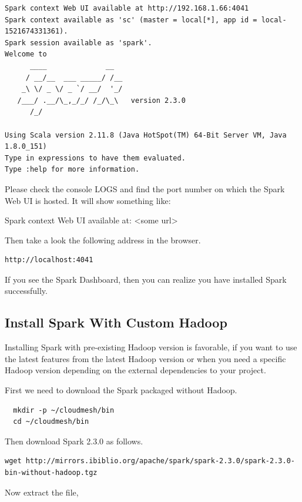 \begin{lstlisting}
Spark context Web UI available at http://192.168.1.66:4041
Spark context available as 'sc' (master = local[*], app id = local-1521674331361).
Spark session available as 'spark'.
Welcome to
      ____              __
     / __/__  ___ _____/ /__
    _\ \/ _ \/ _ `/ __/  '_/
   /___/ .__/\_,_/_/ /_/\_\   version 2.3.0
      /_/
         
Using Scala version 2.11.8 (Java HotSpot(TM) 64-Bit Server VM, Java 1.8.0_151)
Type in expressions to have them evaluated.
Type :help for more information.
\end{lstlisting}

\begin{NOTE}
  Please check the console LOGS and find the port number on which the
  Spark Web UI is hosted. It will show something like:

  Spark context Web UI available at: <some url>
\end{NOTE}

Then take a look the following address in the browser.
\begin{lstlisting}
http://localhost:4041
\end{lstlisting}

If you see the Spark Dashboard, then you can realize you have installed Spark
successfully.

\subsection{Install Spark With Custom Hadoop}

Installing Spark with pre-existing Hadoop version is favorable, if you
want to use the latest features from the latest Hadoop version or when
you need a specific Hadoop version depending on the external
dependencies to your project.

First we need to download the Spark packaged without Hadoop.

\begin{lstlisting}
  mkdir -p ~/cloudmesh/bin
  cd ~/cloudmesh/bin
\end{lstlisting}
  
Then download Spark 2.3.0 as follows. 

\begin{lstlisting}
wget http://mirrors.ibiblio.org/apache/spark/spark-2.3.0/spark-2.3.0-bin-without-hadoop.tgz
\end{lstlisting}

Now extract the file,

